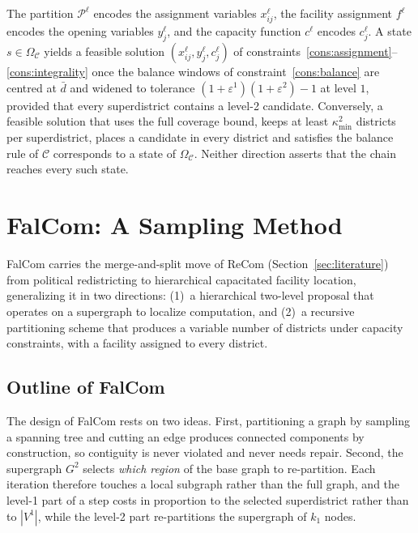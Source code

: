 \documentclass[preprint,12pt,authoryear]{elsarticle}
\theoremstyle{definition}
\begin{document}
The partition $\mathcal{P}^\ell$ encodes the assignment variables $x_{ij}^\ell$,
the facility assignment $f^\ell$ encodes the opening variables $y_j^\ell$, and
the capacity function $c^\ell$ encodes $c^{\ell}_j$. A state $s \in \Omega_\mathcal{C}$ yields a feasible solution $(x_{ij}^\ell, y_j^\ell, c^{\ell}_j)$ of constraints~\eqref{cons:assignment}--\eqref{cons:integrality} once the balance windows of constraint~\eqref{cons:balance} are centred at $\bar d$ and widened to tolerance $(1{+}\varepsilon^1)(1{+}\varepsilon^2)-1$ at level $1$, provided that every superdistrict contains a level-2 candidate. Conversely, a feasible solution that uses the full coverage bound, keeps at least $\kappa^2_{\min}$ districts per superdistrict, places a candidate in every district and satisfies the balance rule of $\mathcal{C}$ corresponds to a state of $\Omega_\mathcal{C}$. Neither direction asserts that the chain reaches every such state.



\section{FalCom: A Sampling Method}
\label{sec:falcom}

FalCom carries the merge-and-split move of ReCom (Section~\ref{sec:literature}) from political redistricting to hierarchical capacitated facility location, generalizing it in two directions: (1)~a hierarchical two-level proposal that operates on a supergraph to localize computation, and (2)~a recursive partitioning scheme that produces a variable number of districts under capacity constraints, with a facility assigned to every district.

\subsection{Outline of FalCom}
\label{sec:outline}

The design of FalCom rests on two ideas. First, partitioning a graph by sampling a spanning tree and cutting an edge produces connected components by construction, so contiguity is never violated and never needs repair. Second, the supergraph $G^2$ selects \emph{which region} of the base graph to re-partition. Each iteration therefore touches a local subgraph rather than the full graph, and the level-1 part of a step costs in proportion to the selected superdistrict rather than to $|V^1|$, while the level-2 part re-partitions the supergraph of $k_1$ nodes.
\end{document}
